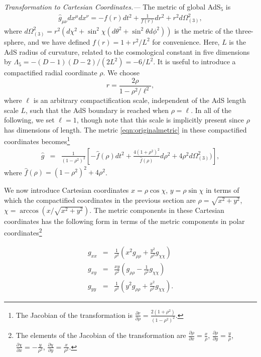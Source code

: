 \documentclass[prl,twocolumn,superscriptaddress]{revtex4-1}
\newcommand{\PRLsection}[1]{\emph{#1.---}}
\begin{document}
\PRLsection{Transformation to Cartesian Coordinates}
The metric of global AdS$_5$ is
\begin{eqnarray}\label{eqn:originalmetric}
\hat{g}_{\mu\nu} dx^\mu dx^\nu = - f(r) dt^2 + \frac{1}{f(r)} dr^2 +r^2 d\Omega_{(3)}^2,
\end{eqnarray}
where $d\Omega_{(3)}^2=r^2 \left( d\chi^2 + \sin^2\chi \left(d\theta^2 + \sin^2\theta d\phi^2\right) \right)$ is the metric of the three-sphere, and we have defined $f(r)=1+r^2/L^2$ for convenience. 
Here, $L$ is the AdS radius of curvature, related to the cosmological constant in five dimensions by $\Lambda_5 = -(D-1)(D-2)/(2 L^2) = -6/L^2$. 
It is useful to introduce a compactified radial coordinate $\rho$. We choose
\begin{equation}\label{eqn:r_def}
r=\frac{2\rho}{1-\rho^2/\ell^2},
\end{equation}
where $\ell$ is an arbitrary compactification scale, independent of the AdS length scale $L$, such that the AdS boundary is reached when $\rho=\ell$. 
In all of the following, we set $\ell=1$, though note that this scale is implicitly present since $\rho$ has dimensions of length. 
The metric \eqref{eqn:originalmetric} in these compactified coordinates becomes\footnote{The Jacobian of the transformation is
$\frac{\partial r}{\partial \rho} = \frac{2(1+\rho^2)}{(1-\rho^2)^2}$.
}
\begin{eqnarray}
\hat{g}
&=& \frac{1}{(1-\rho^2)^2} \left[ -\hat{f}(\rho) dt^2 + \frac{4(1+\rho^2)^2}{\hat{f}(\rho)} d\rho^2 + 4\rho^2 d\Omega_{(3)}^2) \right], 
\end{eqnarray}
where $\hat{f}(\rho) = (1-\rho^2)^2+4\rho^2$.

We now introduce Cartesian coordinates $x=\rho\cos\chi$, $y=\rho\sin\chi$ in terms of which the compactified coordinates in the previous section are $\rho=\sqrt{x^2+y^2}$, $\chi=\arccos\left( x/\sqrt{x^2+y^2} \right)$.
The metric components in these Cartesian coordinates has the following form in terms of the metric components in polar coordinates\footnote{The elements of the Jacobian of the transformation are
$\frac{\partial \rho}{\partial x} = \frac{x}{\rho}$,
$\frac{\partial \rho}{\partial y} = \frac{y}{\rho}$,
$\frac{\partial \chi}{\partial x} = -\frac{y}{\rho^2}$,
$\frac{\partial \chi}{\partial y} = \frac{x}{\rho^2}$.
}

\begin{eqnarray}\label{eqn:cartesianmetric_components}
g_{xx} &=& \frac{1}{\rho^2} \left( x^2 g_{\rho\rho} + \frac{y^2}{\rho^2} g_{\chi\chi} \right) \nonumber \\
g_{xy} &=& \frac{xy}{\rho^2} \left( g_{\rho\rho} - \frac{1}{\rho^2} g_{\chi\chi} \right) \nonumber \\
g_{yy} &=& \frac{1}{\rho^2} \left( y^2 g_{\rho\rho} + \frac{x^2}{\rho^2} g_{\chi\chi} \right).
\end{eqnarray}
\end{document}

